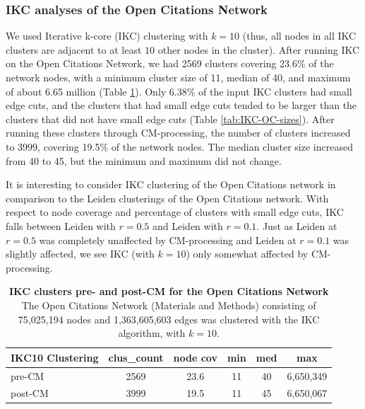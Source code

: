 \documentclass[11pt]{article}   	%
\begin{document}
\subsubsection{IKC analyses of the Open Citations Network}

We used Iterative k-core (IKC) clustering with $k=10$ (thus, all nodes in all  IKC clusters are adjacent to at least $10$ other nodes in the cluster). 
After running IKC on the Open Citations Network, we had 2569 clusters covering 23.6\% of the network nodes, with a minimum cluster size of 11, median of 40, and maximum of about 6.65 million (Table \ref{tab:IKC-11-OC-basicstats}). 
Only 6.38\% of the input IKC clusters had small edge cuts, and the clusters that had small edge cuts tended to be larger
than the clusters that did not have small edge cuts  (Table \ref{tab:IKC-OC-sizes}).
After running these clusters through CM-processing, the number of clusters increased to 3999, covering 19.5\% of the network nodes. The  median cluster size increased from 40 to 45, but the minimum and maximum did not change.

It is interesting to consider IKC clustering of the Open Citations  network in comparison to the Leiden clusterings of the Open Citations network.
With respect to node coverage and percentage of clusters with small edge cuts, IKC falls between Leiden with $r=0.5$ and Leiden with $r=0.1$.  
Just as Leiden at $r=0.5$ was completely unaffected by CM-processing and Leiden at $r=0.1$ was slightly affected, 
we see IKC (with $k=10$) only somewhat affected by CM-processing. 




\begin{table}[ht]
\centering
\begin{tabular}{lccccc}
  \hline
  IKC10 Clustering & clus\_count & node cov & min & med & max       \\ \hline
  pre-CM     & 2569       & 23.6     & 11  & 40  & 6,650,349 \\
  post-CM & 3999 & 19.5 & 11 & 45 & 6,650,067\\
  \hline
\end{tabular}
\caption[IKC clusters pre- and post-CM for the Open Citations Network]{\textbf{IKC clusters pre- and post-CM for the Open Citations Network} The Open Citations Network (Materials and Methods) consisting of 75,025,194 nodes and 1,363,605,603 edges was clustered with the IKC algorithm, with $k=10$.
}
\label{tab:IKC-11-OC-basicstats}
\end{table}
\end{document}
